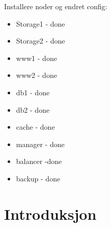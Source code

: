 \documentclass[a4paper, norsk, 12pt]{article}
\begin{document}
Installere noder og endret config:
\begin{itemize}
\item Storage1 - done
\item Storage2 - done
\item www1 - done
\item www2 - done
\item db1 - done
\item db2 - done
\item cache - done
\item manager - done
\item balancer -done
\item backup - done
\end{itemize}





\section{Introduksjon} 




%

\end{document}
